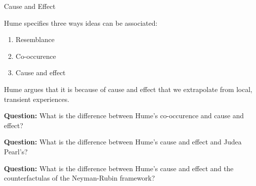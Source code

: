 \documentclass[8pt]{beamer}\usepackage[]{graphicx}\usepackage[]{color}
\begin{document}

\begin{frame}{Cause and Effect}

Hume specifies three ways ideas can be associated:
%
\begin{enumerate}
%
\item Resemblance
\item Co-occurence
\item Cause and effect
%
\end{enumerate}
%
Hume argues that it is because of cause and effect that we extrapolate
from local, transient experiences.

\pause
\textbf{Question:} What is the difference between Hume's co-occurence and
cause and effect?

\pause
\textbf{Question:} What is the difference between Hume's
cause and effect and Judea Pearl's?

\pause
\textbf{Question:} What is the difference between Hume's
cause and effect and the counterfactulas of the Neyman-Rubin framework?

\end{frame}

\end{document}
